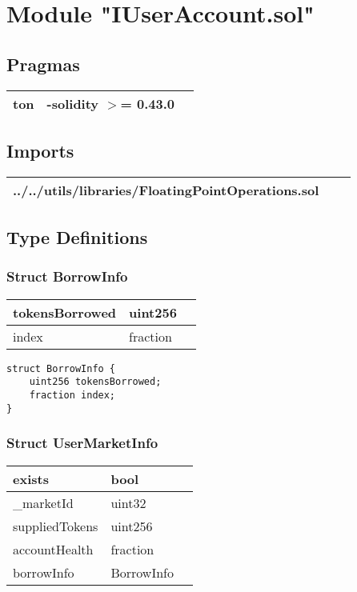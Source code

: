 
\section{Module "IUserAccount.sol"}


\subsection{Pragmas}


\noindent\begin{tabular}{|l|l|p{5cm}|}\hline
ton & -solidity $>$= 0.43.0 &\\\hline
\end{tabular}


\subsection{Imports}


\noindent\begin{tabular}{|l|l|p{5cm}|}\hline
../../utils/libraries/FloatingPointOperations.sol &\\\hline
\end{tabular}


\subsection{Type Definitions}


\subsubsection{Struct BorrowInfo}


\ifsoltables
\noindent\begin{tabular}{|l|l|p{6cm}|}\hline
tokensBorrowed & uint256 & \\\hline
index & fraction & \\\hline
\end{tabular}
\fi


\begin{lstlisting}[firstnumber=5]
struct BorrowInfo {
    uint256 tokensBorrowed;
    fraction index;
}
\end{lstlisting}

\subsubsection{Struct UserMarketInfo}


\ifsoltables
\noindent\begin{tabular}{|l|l|p{6cm}|}\hline
exists & bool & \\\hline
\_{}marketId & uint32 & \\\hline
suppliedTokens & uint256 & \\\hline
accountHealth & fraction & \\\hline
borrowInfo & BorrowInfo & \\\hline
\end{tabular}
\fi


